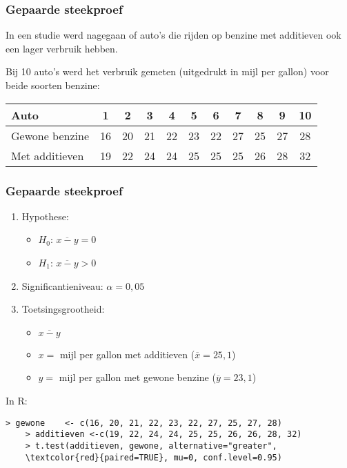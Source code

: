 \documentclass[aspectratio=169]{beamer}
\begin{document}
\begin{frame}
  \frametitle{Gepaarde steekproef}
  
  In een studie werd nagegaan of auto's die rijden op benzine met additieven ook een lager verbruik hebben.
  
  Bij 10 auto's werd het verbruik gemeten (uitgedrukt in mijl per gallon) voor beide soorten benzine:
  
  \vspace{.5cm}
  \centering
  \begin{tabular}{|l|c|c|c|c|c|c|c|c|c|c|}
    \hline
    Auto           & 1  & 2  & 3  & 4  & 5  & 6  & 7  & 8  & 9  & 10 \\ \hline
    Gewone benzine & 16 & 20 & 21 & 22 & 23 & 22 & 27 & 25 & 27 & 28 \\ \hline
    Met additieven & 19 & 22 & 24 & 24 & 25 & 25 & 25 & 26 & 28 & 32 \\ \hline
  \end{tabular} 
\end{frame}

\begin{frame}[fragile]
  \frametitle{Gepaarde steekproef}
  \begin{enumerate}
    \item Hypothese:
    \begin{itemize}
      \item $H_0$: $\overline{x-y} = 0$
      \item $H_1$: $\overline{x-y} > 0$
    \end{itemize}
    \item Significantieniveau: $\alpha = 0,05$
    \item Toetsingsgrootheid:
    \begin{itemize}
      \item $\overline{x-y}$
      \item $x =$ mijl per gallon met additieven ($\overline{x}=25,1$)
      \item $y =$ mijl per gallon met gewone benzine ($\overline{y}=23,1$)
    \end{itemize}
  \end{enumerate}
  \vfill
  In R:
  {\footnotesize
    \begin{Verbatim}[commandchars=\\\{\}]
    > gewone    <- c(16, 20, 21, 22, 23, 22, 27, 25, 27, 28)
    > additieven <-c(19, 22, 24, 24, 25, 25, 26, 26, 28, 32)
    > t.test(additieven, gewone, alternative="greater",
    \textcolor{red}{paired=TRUE}, mu=0, conf.level=0.95)
    \end{Verbatim}
  }
\end{frame}
\end{document}
